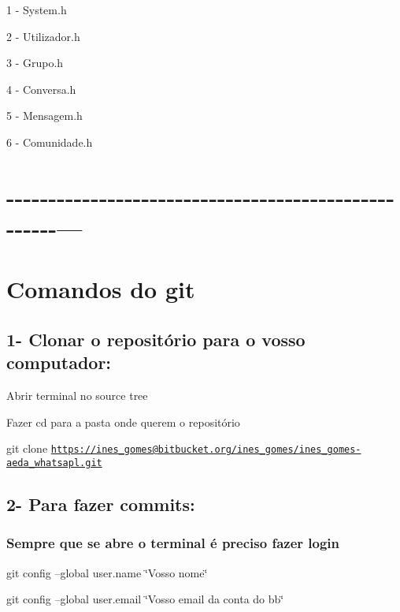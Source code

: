 1 -\/ System.\+h

2 -\/ Utilizador.\+h

3 -\/ Grupo.\+h

4 -\/ Conversa.\+h

5 -\/ Mensagem.\+h

6 -\/ Comunidade.\+h

\section*{-\/-\/-\/-\/-\/-\/-\/-\/-\/-\/-\/-\/-\/-\/-\/-\/-\/-\/-\/-\/-\/-\/-\/-\/-\/-\/-\/-\/-\/-\/-\/-\/-\/-\/-\/-\/-\/-\/-\/-\/-\/-\/-\/-\/-\/-\/-\/-\/-\/-\/-\/-\/---}

\section*{Comandos do git}

\subsection*{1-\/ Clonar o repositório para o vosso computador\+:}


\begin{DoxyItemize}
\item Abrir terminal no source tree
\item Fazer cd para a pasta onde querem o repositório
\item git clone \href{https://ines_gomes@bitbucket.org/ines_gomes/ines_gomes-aeda_whatsapl.git}{\tt https\+://ines\+\_\+gomes@bitbucket.\+org/ines\+\_\+gomes/ines\+\_\+gomes-\/aeda\+\_\+whatsapl.\+git}
\end{DoxyItemize}

\subsection*{2-\/ Para fazer commits\+:}

\subsubsection*{Sempre que se abre o terminal é preciso fazer login}


\begin{DoxyItemize}
\item git config --global user.\+name \char`\"{}\+Vosso nome\char`\"{}
\item git config --global user.\+email \char`\"{}\+Vosso email da conta do bb\char`\"{}
\end{DoxyItemize}

